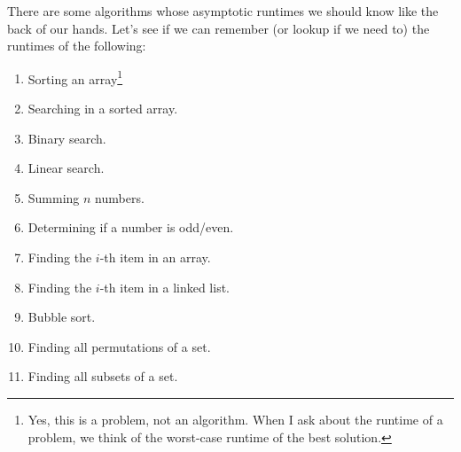 \documentclass{article}
\begin{document}
There are some algorithms whose asymptotic runtimes we should know like the back
of our hands.  Let's see if we can remember (or lookup if we need to) the
runtimes of the following:
{\color{blue}
\begin{enumerate}
    \item Sorting an array\footnote{Yes, this is a problem, not an algorithm.
        When I ask about the runtime of a problem, we think of the
        worst-case runtime of the best solution.}
    \item Searching in a sorted array.
    \item Binary search.
    \item Linear search.
    \item Summing $n$ numbers.
    \item Determining if a number is odd/even.
    \item Finding the $i$-th item in an array.
    \item Finding the $i$-th item in a linked list.
    \item Bubble sort.
    \item Finding all permutations of a set.
    \item Finding all subsets of a set.
\end{enumerate}
}
\end{document}
